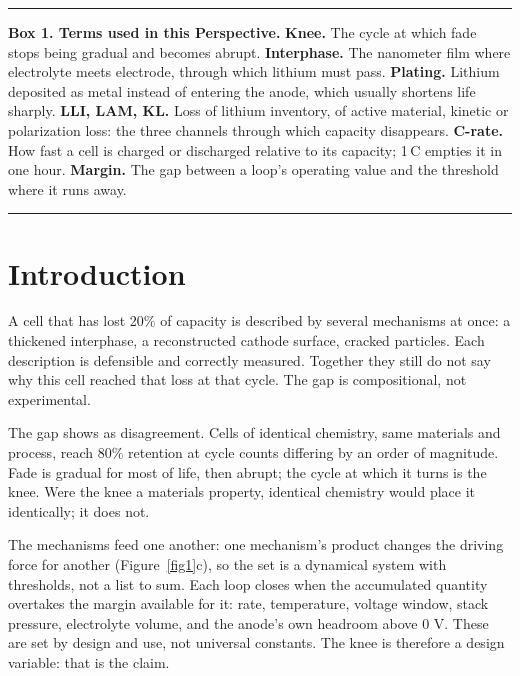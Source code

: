 \documentclass[AMA,Times2COL]{WileyNJDv5}
\begin{document}
\maketitle



\begin{table}[!t]
\begin{center}
\begin{minipage}{\textwidth}
\hrule\vspace{3pt}
\noindent\textbf{Box 1. Terms used in this Perspective.} \textbf{Knee.} The cycle at which fade stops being gradual and becomes abrupt. \textbf{Interphase.} The nanometer film where electrolyte meets electrode, through which lithium must pass. \textbf{Plating.} Lithium deposited as metal instead of entering the anode, which usually shortens life sharply. \textbf{LLI, LAM, KL.} Loss of lithium inventory, of active material, kinetic or polarization loss: the three channels through which capacity disappears. \textbf{C-rate.} How fast a cell is charged or discharged relative to its capacity; 1\,C empties it in one hour. \textbf{Margin.} The gap between a loop's operating value and the threshold where it runs away.
\vspace{3pt}\hrule
\end{minipage}
\end{center}
\end{table}

\section{Introduction}\label{sec:Introduction}
A cell that has lost 20\% of capacity is described by several mechanisms at once: a thickened interphase,\cite{adenusi2023lithium} a reconstructed cathode surface,\cite{tornheim2019effect} cracked particles.\cite{wheatcroft2023fracture} Each description is defensible and correctly measured. Together they still do not say why this cell reached that loss at that cycle. The gap is compositional, not experimental.

The gap shows as disagreement. Cells of identical chemistry, same materials and process, reach 80\% retention at cycle counts differing by an order of magnitude. Fade is gradual for most of life, then abrupt; the cycle at which it turns is the knee. Were the knee a materials property, identical chemistry would place it identically; it does not.

The mechanisms feed one another: one mechanism's product changes the driving force for another (Figure~\ref{fig1}c), so the set is a dynamical system with thresholds, not a list to sum. Each loop closes when the accumulated quantity overtakes the margin available for it: rate, temperature, voltage window, stack pressure, electrolyte volume, and the anode's own headroom above 0 V. These are set by design and use, not universal constants. The knee is therefore a design variable: that is the claim.
\end{document}
